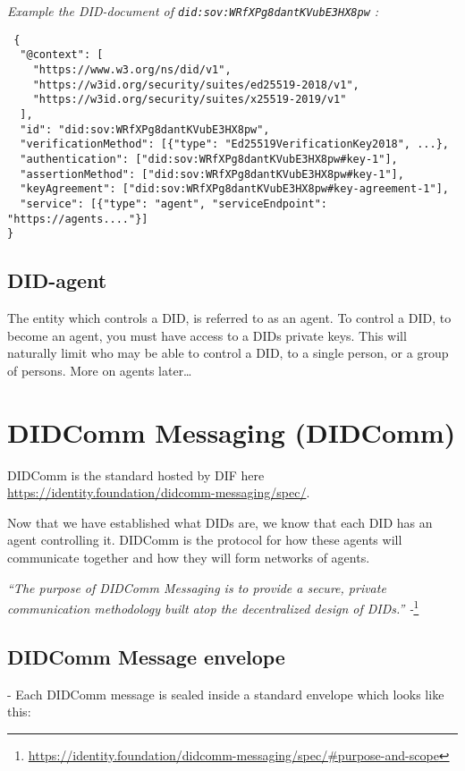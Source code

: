 \emph{Example the DID-document of \lstinline!did:sov:WRfXPg8dantKVubE3HX8pw! :}

\begin{lstlisting}
 {
  "@context": [
    "https://www.w3.org/ns/did/v1",
    "https://w3id.org/security/suites/ed25519-2018/v1",
    "https://w3id.org/security/suites/x25519-2019/v1"
  ],
  "id": "did:sov:WRfXPg8dantKVubE3HX8pw",
  "verificationMethod": [{"type": "Ed25519VerificationKey2018", ...},
  "authentication": ["did:sov:WRfXPg8dantKVubE3HX8pw#key-1"],
  "assertionMethod": ["did:sov:WRfXPg8dantKVubE3HX8pw#key-1"],
  "keyAgreement": ["did:sov:WRfXPg8dantKVubE3HX8pw#key-agreement-1"],
  "service": [{"type": "agent", "serviceEndpoint": "https://agents...."}]
}
\end{lstlisting}

\subsection{DID-agent}

The entity which controls a DID, is referred to as an agent. To control
a DID, to become an agent, you must have access to a DIDs private keys.
This will naturally limit who may be able to control a DID, to a single
person, or a group of persons. More on agents later\ldots{}




\hypertarget{didcomm-messaging-didcomm}{%
\section{DIDComm Messaging
(DIDComm)}\label{didcomm-messaging-didcomm}}

DIDComm is the standard hosted by DIF here \url{https://identity.foundation/didcomm-messaging/spec/}.

Now that we have established what DIDs are, we know that each DID has an
agent controlling it. DIDComm is the protocol for how these agents will
communicate together and how they will form networks of agents.

\emph{``The purpose of DIDComm Messaging is to provide a secure, private
communication methodology built atop the decentralized design of DIDs.''
-}\footnote{\url{https://identity.foundation/didcomm-messaging/spec/\#purpose-and-scope}}



\subsection{DIDComm Message envelope} - Each DIDComm message is sealed inside a standard envelope which looks
like this:

